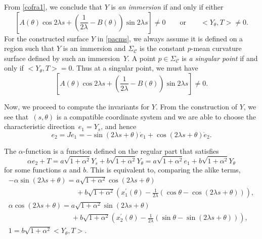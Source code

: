 \documentclass[10pt,a4paper]{amsart}
\numberwithin{equation}{section}
\begin{document}
From \eqref{cofra1}, we conclude that $Y$ is \emph{an immersion} if and
only if either
\[
\left[A(\theta)\cos{2\lambda s}+\left(\frac{1}{2\lambda}-B(\theta)\right)\sin
{2\lambda s}\right]\neq 0\qquad \text{or}\qquad \big<Y_{\theta},T\big>\neq 0.
\]
For the constructed surface $Y$ in \eqref{pacms}, we always assume it is
defined on a region such that $Y$ is an immersion and $\Sigma_{\mathcal{C}}$
is the constant $p$-mean curvature surface defined by such an immersion~$Y$.
A point $p\in \Sigma_{\mathcal{C}}$ is \emph{a singular point} if and only
if $\big<Y_{\theta},T\big>=0$. Thus at a singular point, we must have
\[
\left[A(\theta)\cos{2\lambda s}+\left(\frac{1}{2\lambda}-B(\theta)\right)\sin
{2\lambda s}\right]\neq 0.
\]

Now, we proceed to compute the invariants for $Y$. From the construction of $
Y $, we see that~$(s,\theta)$ is a compatible coordinate system and we are able to
choose the characteristic direction~${e_{1}=Y_{s}}$, and hence
\[
e_{2}=Je_{1}=-\sin{(2\lambda s+\theta)}\mathring e_1+\cos{(2\lambda s+\theta)
}\mathring e_2.
\]

The $\alpha $-function is a function defined on the regular part that
satisfies \[\alpha e_{2}+T=a\sqrt{1+\alpha ^{2}}Y_{s}+b\sqrt{1+\alpha ^{2}}
Y_{\theta }=a\sqrt{1+\alpha ^{2}}e_{1}+b\sqrt{1+\alpha ^{2}}Y_{\theta }\] for
some functions $a$ and $b$. This is equivalent to, comparing the alike terms,
\begin{gather*}
-\alpha \sin {(2\lambda s+\theta )} =a\sqrt{1+\alpha ^{2}}\cos {(2\lambda
s+\theta )}\\
\phantom{-\alpha \sin {(2\lambda s+\theta )} =}{}+b\sqrt{1+\alpha ^{2}}\left( x_{1}^{\prime }(\theta )-\frac{1}{
2\lambda }(\cos {\theta }-\cos {(2\lambda s+\theta )})\right), \\
\alpha \cos {(2\lambda s+\theta )}=a\sqrt{1+\alpha ^{2}}\sin {(2\lambda
s+\theta )}\\
\phantom{\alpha \cos {(2\lambda s+\theta )}=}{}+b\sqrt{1+\alpha ^{2}}\left( x_{2}^{\prime }(\theta )-\frac{1}{
2\lambda }(\sin {\theta }-\sin {(2\lambda s+\theta )})\right), \\
1 =b\sqrt{1+\alpha ^{2}}\big<Y_{\theta },T\big>.
\end{gather*}
\end{document}

